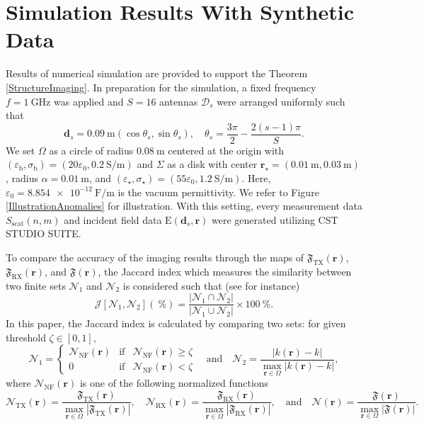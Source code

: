 \documentclass[3p,10pt]{elsarticle}
\newcommand{\eps}{\varepsilon}
\newcommand{\epsb}{\varepsilon_\mathrm{b}}
\newcommand{\sigmab}{\sigma_\mathrm{b}}
\newcommand{\E}{\mathrm{E}}
\newcommand{\md}{\mathbf{d}}
\newcommand{\mr}{\mathbf{r}}
\DeclareMathOperator*{\scat}{scat}
\DeclareMathOperator*{\tx}{TX}
\DeclareMathOperator*{\rx}{RX}
\DeclareMathOperator*{\NF}{NF}
\theoremstyle{plain}
\theoremstyle{remark}
\begin{document}
\section{Simulation Results With Synthetic Data}\label{sec:4}
Results of numerical simulation are provided to support the Theorem \ref{StructureImaging}. In preparation for the simulation, a fixed frequency $f=\SI{1}{\GHz}$ was applied and $S=16$ antennas $\mathcal{D}_s$ were arranged uniformly such that
\[\md_s=\SI{0.09}{\meter}(\cos\theta_s,\sin\theta_s),\quad\theta_s=\frac{3\pi}{2}-\frac{2(s-1)\pi}{S}.\]
We set $\Omega$ as a circle of radius $\SI{0.08}{\meter}$ centered at the origin with $(\epsb,\sigmab)=(20\eps_0,\SI{0.2}{\siemens/\meter})$ and $\Sigma$ as a disk with center $\mr_\star=(\SI{0.01}{\meter},\SI{0.03}{\meter})$, radius $\alpha=\SI{0.01}{\meter}$, and $(\eps_\star,\sigma_\star)=(55\eps_0,\SI{1.2}{\siemens/\meter})$. Here, $\eps_0=\SI{8.854e-12}{\farad/\meter}$ is the vacuum permittivity. We refer to Figure \ref{IllustrationAnomalies} for illustration. With this setting, every measurement data $S_{\scat}(n,m)$ and incident field data $\E(\md_s,\mr)$ were generated utilizing CST STUDIO SUITE.

To compare the accuracy of the imaging results through the maps of $\mathfrak{F}_{\tx}(\mr)$, $\mathfrak{F}_{\rx}(\mr)$, and $\mathfrak{F}(\mr)$, the Jaccard index which measures the similarity between two finite sets $\mathcal{N}_1$ and $\mathcal{N}_2$ is considered such that (see \cite{Jaccard} for instance)
\[\mathcal{J}[\mathcal{N}_1,\mathcal{N}_2](\SI{}{\percent})=\frac{|\mathcal{N}_1\cap\mathcal{N}_2|}{|\mathcal{N}_1\cup\mathcal{N}_2|}\times\SI{100}{\percent}.\]
In this paper, the Jaccard index is calculated by comparing two sets: for given threshold $\zeta\in[0,1]$,
\[\mathcal{N}_1=\left\{\begin{array}{ccl}
\mathcal{N}_{\NF}(\mr)&\text{if}&\mathcal{N}_{\NF}(\mr)\geq\zeta\\
0&\text{if}&\mathcal{N}_{\NF}(\mr)<\zeta
\end{array}\right.\quad\text{and}\quad
\mathcal{N}_2=\frac{|k(\mr)-k|}{\displaystyle\max_{\mr\in\Omega}|k(\mr)-k|},\]
where $\mathcal{N}_{\NF}(\mr)$ is one of the following normalized functions
\[\mathcal{N}_{\tx}(\mr)=\frac{\mathfrak{F}_{\tx}(\mr)}{\displaystyle\max_{\mr\in\Omega}|\mathfrak{F}_{\tx}(\mr)|},\quad\mathcal{N}_{\rx}(\mr)=\frac{\mathfrak{F}_{\rx}(\mr)}{\displaystyle\max_{\mr\in\Omega}|\mathfrak{F}_{\rx}(\mr)|},\quad\text{and}\quad\mathcal{N}(\mr)=\frac{\mathfrak{F}(\mr)}{\displaystyle\max_{\mr\in\Omega}|\mathfrak{F}(\mr)|}.\]
\end{document}
